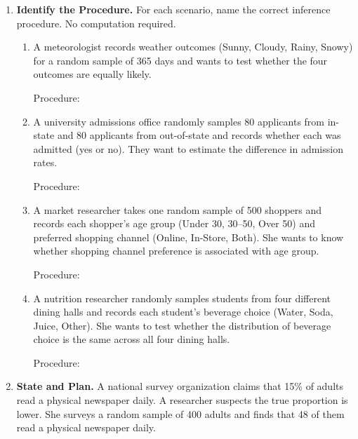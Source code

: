 \documentclass[10pt]{article}
\begin{document}
\namedateperiod

\vspace{0.10in}

\begin{enumerate}

\item \textbf{Identify the Procedure.} \; For each scenario, name the correct inference
      procedure. No computation required.

\begin{enumerate}[label=\alph*.]
  \item A meteorologist records weather outcomes (Sunny, Cloudy, Rainy, Snowy) for a random
        sample of 365 days and wants to test whether the four outcomes are equally likely.

        Procedure: \blank{9cm}

  \item A university admissions office randomly samples 80 applicants from in-state and 80
        applicants from out-of-state and records whether each was admitted (yes or no). They
        want to estimate the difference in admission rates.

        Procedure: \blank{9cm}

  \item A market researcher takes one random sample of 500 shoppers and records each shopper's
        age group (Under 30, 30--50, Over 50) and preferred shopping channel (Online, In-Store,
        Both). She wants to know whether shopping channel preference is associated with age group.

        Procedure: \blank{9cm}

  \item A nutrition researcher randomly samples students from four different dining halls and
        records each student's beverage choice (Water, Soda, Juice, Other). She wants to test
        whether the distribution of beverage choice is the same across all four dining halls.

        Procedure: \blank{9cm}
\end{enumerate}

\vspace{0.10in}

\item \textbf{State and Plan.} \;
      A national survey organization claims that 15\% of adults read a physical newspaper daily.
      A researcher suspects the true proportion is lower. She surveys a random sample of 400 adults
      and finds that 48 of them read a physical newspaper daily.


\end{enumerate}
\end{document}
